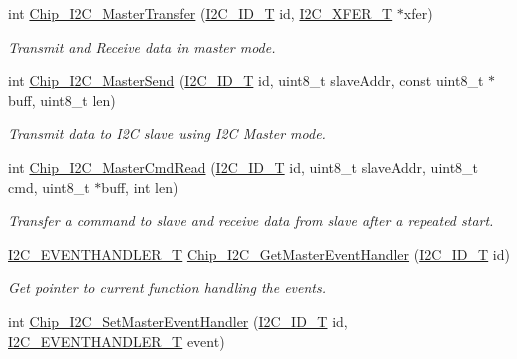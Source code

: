 \begin{DoxyCompactItemize}
int \hyperlink{group__I2C__17XX__40XX_ga5f89391d66048894f4365d3b2b7df267}{Chip\-\_\-\-I2\-C\-\_\-\-Master\-Transfer} (\hyperlink{group__I2C__17XX__40XX_ga957556a4d900506cd4cba8427afd81e6}{I2\-C\-\_\-\-I\-D\-\_\-\-T} id, \hyperlink{structI2C__XFER__T}{I2\-C\-\_\-\-X\-F\-E\-R\-\_\-\-T} $\ast$xfer)
\begin{DoxyCompactList}\small\item\em Transmit and Receive data in master mode. \end{DoxyCompactList}\item 
int \hyperlink{group__I2C__17XX__40XX_ga9ff549bdb526786d313c141b11cab43e}{Chip\-\_\-\-I2\-C\-\_\-\-Master\-Send} (\hyperlink{group__I2C__17XX__40XX_ga957556a4d900506cd4cba8427afd81e6}{I2\-C\-\_\-\-I\-D\-\_\-\-T} id, uint8\-\_\-t slave\-Addr, const uint8\-\_\-t $\ast$buff, uint8\-\_\-t len)
\begin{DoxyCompactList}\small\item\em Transmit data to I2\-C slave using I2\-C Master mode. \end{DoxyCompactList}\item 
int \hyperlink{group__I2C__17XX__40XX_ga4a875b456dfe68acbe8ce1fc74d88bd3}{Chip\-\_\-\-I2\-C\-\_\-\-Master\-Cmd\-Read} (\hyperlink{group__I2C__17XX__40XX_ga957556a4d900506cd4cba8427afd81e6}{I2\-C\-\_\-\-I\-D\-\_\-\-T} id, uint8\-\_\-t slave\-Addr, uint8\-\_\-t cmd, uint8\-\_\-t $\ast$buff, int len)
\begin{DoxyCompactList}\small\item\em Transfer a command to slave and receive data from slave after a repeated start. \end{DoxyCompactList}\item 
\hyperlink{group__I2C__17XX__40XX_ga932bfc2f55180a71b93427e88b6223e6}{I2\-C\-\_\-\-E\-V\-E\-N\-T\-H\-A\-N\-D\-L\-E\-R\-\_\-\-T} \hyperlink{group__I2C__17XX__40XX_gafad03b4f6c0ecb3f59f014ab63bfda5c}{Chip\-\_\-\-I2\-C\-\_\-\-Get\-Master\-Event\-Handler} (\hyperlink{group__I2C__17XX__40XX_ga957556a4d900506cd4cba8427afd81e6}{I2\-C\-\_\-\-I\-D\-\_\-\-T} id)
\begin{DoxyCompactList}\small\item\em Get pointer to current function handling the events. \end{DoxyCompactList}\item 
int \hyperlink{group__I2C__17XX__40XX_ga1fc3fc0946344e9551d9eef0bbf610b9}{Chip\-\_\-\-I2\-C\-\_\-\-Set\-Master\-Event\-Handler} (\hyperlink{group__I2C__17XX__40XX_ga957556a4d900506cd4cba8427afd81e6}{I2\-C\-\_\-\-I\-D\-\_\-\-T} id, \hyperlink{group__I2C__17XX__40XX_ga932bfc2f55180a71b93427e88b6223e6}{I2\-C\-\_\-\-E\-V\-E\-N\-T\-H\-A\-N\-D\-L\-E\-R\-\_\-\-T} event)

\end{DoxyCompactItemize}
